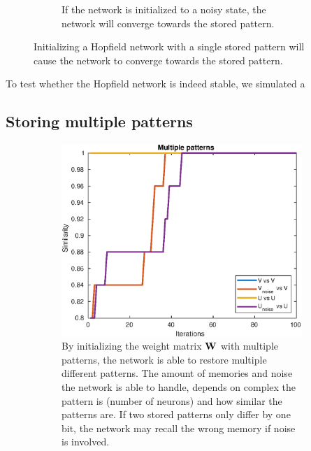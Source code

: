 \begin{figure}[H]
\begin{subfigure}{0.49\textwidth}
        \caption{If the network is initialized to a noisy state, the network will converge towards the stored pattern. }
    \end{subfigure}
    \caption{Initializing a Hopfield network with a single stored pattern will cause the network to converge towards the stored pattern.}
\end{figure}
To test whether the Hopfield network is indeed stable, we simulated a 

\subsection{Storing multiple patterns}
\begin{figure}[H]
    \centering
    \begin{subfigure}{0.49\textwidth}
        \includegraphics[width=\textwidth]{figs/multiple-patterns.eps}
        \caption{By initializing the weight matrix $\bf W$ with multiple patterns, the network is able to restore multiple different patterns. The amount of memories and noise the network is able to handle, depends on complex the pattern is (number of neurons) and how similar the patterns are. If two stored patterns only differ by one bit, the network may recall the wrong memory if noise is involved. }
    \end{subfigure}
    \begin{subfigure}{0.49\textwidth}

\end{subfigure}
\end{figure}
